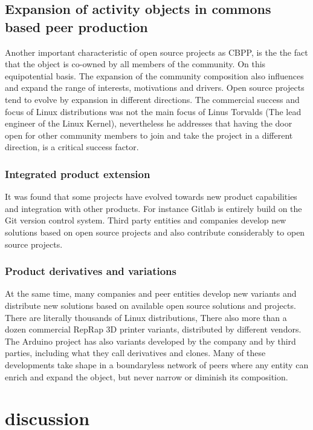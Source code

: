 \documentclass{ICED-Paper}%
\begin{document}
\subsection{Expansion of activity objects in commons based peer production}
Another important characteristic of open source projects as CBPP, is the the fact that the object is co-owned by all members of the community. On this equipotential basis. The expansion of the community composition also influences and expand the range of interests, motivations and drivers. Open source projects tend to evolve by expansion in different directions. The commercial success and focus of Linux distributions was not the main focus of Linus Torvalds (The lead engineer of the Linux Kernel), nevertheless he addresses that having the door open for other community members to join and take the project in a different direction, is a critical success factor.

\subsubsection{Integrated product extension}
It was found that some projects have evolved towards new product capabilities and integration with other products. For instance Gitlab is entirely build on the Git version control system. Third party entities and companies develop new solutions based on open source projects and also contribute considerably to open source projects.

\subsubsection{Product derivatives and variations}
At the same time, many companies and peer entities develop new variants and distribute new solutions based on available open source solutions and projects. There are literally thousands of Linux distributions, There also more than a dozen commercial RepRap 3D printer variants, distributed by different vendors. The Arduino project has also variants developed by the company and by third parties, including what they call derivatives and clones. Many of these developments take shape in a boundaryless network of peers where any entity can enrich and expand the object, but never narrow or diminish its composition.

\section{discussion}
\end{document}
